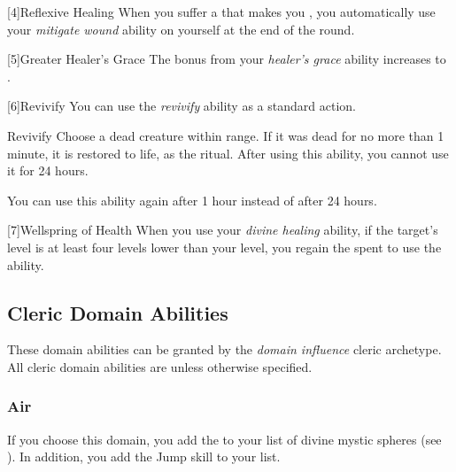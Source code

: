         [4]{Reflexive Healing} When you suffer a  that makes you , you automatically use your \textit{mitigate wound} ability on yourself at the end of the round.

        [5]{Greater Healer's Grace} The bonus from your \textit{healer's grace} ability increases to .

        [6]{Revivify} You can use the \textit{revivify} ability as a standard action.
        \begin{apability}{Revivify}
            Choose a dead creature within \rngclose range.
            If it was dead for no more than 1 minute, it is restored to life, as the  ritual.
            After using this ability, you cannot use it for 24 hours.

            \rankline
             You can use this ability again after 1 hour instead of after 24 hours.
        \end{apability}

        [7]{Wellspring of Health} When you use your \textit{divine healing} ability,
            if the target's level is at least four levels lower than your level,
            you regain the  spent to use the ability.

    \subsection{Cleric Domain Abilities}\label{Cleric Domain Abilities}
        These domain abilities can be granted by the \textit{domain influence} cleric archetype.
        All cleric domain abilities are  unless otherwise specified.

        \subsubsection{Air}
            If you choose this domain, you add the   to your list of divine mystic spheres (see ).
            In addition, you add the Jump skill to your  list.

